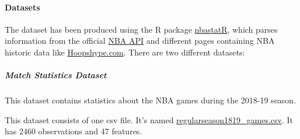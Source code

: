 \documentclass[
]{article}
\begin{document}
\hypertarget{datasets}{%
\paragraph{Datasets}\label{datasets}}

The dataset has been produced using the R package
\href{http://asbcllc.com/nbastatR/}{nbastatR}, which parses information
from the official \href{https://stats.nba.com/}{NBA API} and different
pages containing NBA historic data like
\href{https://hoopshype.com/}{Hoopshype.com}. There are two different
datasets:

\hypertarget{match-statistics-dataset}{%
\subparagraph{Match Statistics Dataset}\label{match-statistics-dataset}}

This dataset contains statistics about the NBA games during the 2018-19
season.

This dataset consists of one csv file. It's named
\href{https://github.com/AlmaProcesses/NBA_Project/blob/master/data/regularseason1819_games.csv}{regularseason1819\_games.csv}.
It has 2460 observations and 47 features.
\end{document}
